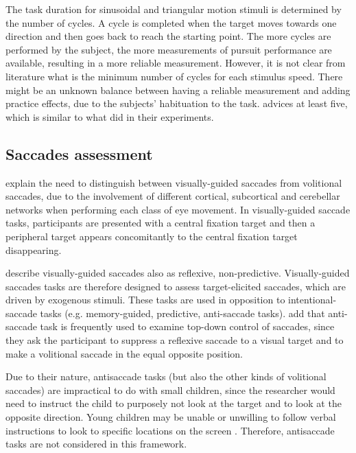 The task duration for sinusoidal and triangular motion stimuli is determined by the number of cycles. A cycle is completed when the target moves towards one direction and then goes back to reach the starting point. The more cycles are performed by the subject, the more measurements of pursuit performance are available, resulting in a more reliable measurement. However, it is not clear from literature what is the minimum number of cycles for each stimulus speed. There might be an unknown balance between having a reliable measurement and adding practice effects, due to the subjects’ habituation to the task. \cite{smyrnis2008guidelines} advices at least five, which is similar to what  \cite{vonhofsten1997smoothpursuit} did in their experiments.



\subsection{Saccades assessment}
\label{sec:fwksaccades}

\cite{johnson2016review} explain the need to distinguish between visually-guided saccades from volitional saccades, due to the involvement of different cortical, subcortical and cerebellar networks when performing each class of eye movement. In visually-guided saccade tasks, participants are presented with a central fixation target and then a peripheral target appears concomitantly to the central fixation target disappearing.

\cite{brenner2007visualsearch} describe visually-guided saccades also as reflexive, non-predictive. Visually-guided saccades tasks are therefore designed to assess target-elicited saccades, which are driven by exogenous stimuli. These tasks are used in opposition to intentional-saccade tasks (e.g. memory-guided, predictive, anti-saccade tasks). \cite{johnson2016review} add that anti-saccade task is frequently used to examine top-down control of saccades, since they ask the participant to suppress a reflexive saccade to a visual target and to make a volitional saccade in the equal opposite position.

Due to their nature, antisaccade tasks (but also the other kinds of volitional saccades) are impractical to do with small children, since the researcher would need to instruct the child to purposely not look at the target and to look at the opposite direction. Young children may be unable or unwilling to follow verbal instructions to look to specific locations on the screen \citep{sasson2012children}. Therefore, antisaccade tasks are not considered in this framework.

